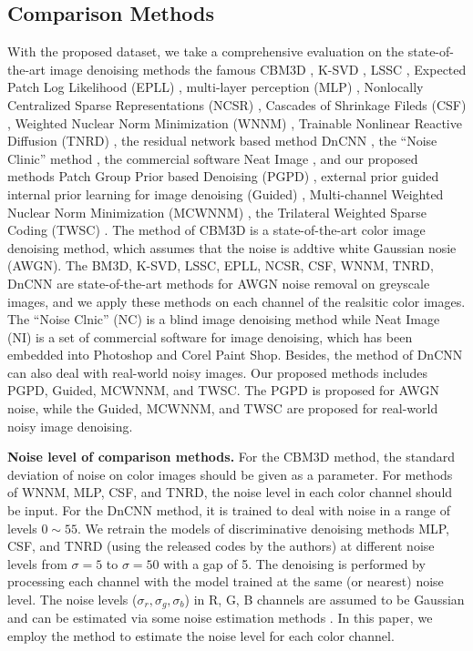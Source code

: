 \subsection{Comparison Methods}

With the proposed dataset, we take a comprehensive evaluation on the state-of-the-art image denoising methods the famous CBM3D \cite{cbm3d}, K-SVD \cite{ksvd}, LSSC \cite{lssc}, Expected Patch Log Likelihood (EPLL) \cite{epll}, multi-layer perception (MLP) \cite{mlp}, Nonlocally Centralized Sparse Representations (NCSR) \cite{ncsr}, Cascades of Shrinkage Fileds (CSF) \cite{csf}, Weighted Nuclear Norm Minimization (WNNM) \cite{wnnm}, Trainable Nonlinear Reactive Diffusion (TNRD) \cite{tnrd}, the residual network based method DnCNN \cite{dncnn}, the ``Noise Clinic'' method \cite{noiseclinic,ncwebsite}, the commercial software Neat Image \cite{neatimage}, and our proposed methods Patch Group Prior based Denoising (PGPD) \cite{pgpd}, external prior guided internal prior learning for image denoising (Guided) \cite{guided}, Multi-channel Weighted Nuclear Norm Minimization (MCWNNM) \cite{mcwnnm}, the Trilateral Weighted Sparse Coding (TWSC) \cite{twsc}. The method of CBM3D is a state-of-the-art color image denoising method, which assumes that the noise is addtive white Gaussian nosie (AWGN). The BM3D, K-SVD, LSSC, EPLL, NCSR, CSF, WNNM, TNRD, DnCNN are state-of-the-art methods for AWGN noise removal on greyscale images, and we apply these methods on each channel of the realsitic color images.  The ``Noise Clnic'' (NC) is a blind image denoising method while Neat Image (NI) is a set of commercial software for image denoising, which has been embedded into Photoshop and Corel Paint Shop. Besides, the method of DnCNN \cite{dncnn} can also deal with real-world noisy images. Our proposed methods includes PGPD, Guided, MCWNNM, and TWSC. The PGPD is proposed for AWGN noise, while the Guided, MCWNNM, and TWSC are proposed for real-world noisy image denoising.

\textbf{Noise level of comparison methods.} For the CBM3D method, the standard deviation of noise on color images should be given as a parameter. For methods of WNNM, MLP, CSF, and TNRD, the noise level in each color channel should be input. For the DnCNN method, it is trained to deal with noise in a range of levels $0\sim55$. We retrain the models of discriminative denoising methods MLP, CSF, and TNRD (using the released codes by the authors) at different noise levels from $\sigma=5$ to $\sigma=50$ with a gap of 5. The denoising is performed by processing each channel with the model trained at the same (or nearest) noise level. The noise levels ($\sigma_{r}, \sigma_{g}, \sigma_{b}$) in R, G, B channels are assumed to be Gaussian and can be estimated via some noise estimation methods \cite{noiselevel,Chen2015ICCV}. In this paper, we employ the method \cite{noiselevel} to estimate the noise level for each color channel.


